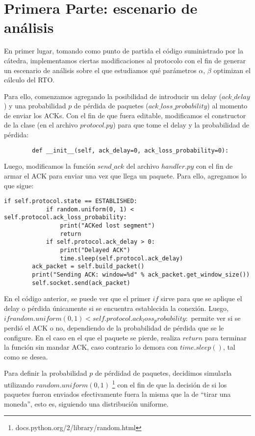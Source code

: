 \documentclass[10pt, a4paper]{article}
\begin{document}
\section{Primera Parte: escenario de análisis}

En primer lugar, tomando como punto de partida el código suministrado por la cátedra, implementamos ciertas modificaciones al protocolo con el fin de generar un escenario de análisis sobre el que estudiamos qué parámetros $\alpha$, $\beta$ optimizan el cálculo del RTO.

Para ello, comenzamos agregando la posibilidad de introducir un delay ($ack\_delay$) y una probabilidad $p$ de pérdida de paquetes ($ack\_loss\_probability$) al momento de enviar los ACKs. Con el fin de que fuera editable, modificamos el constructor de la clase (en el archivo $protocol.py$) para que tome el delay y la probabilidad de pérdida:
\begin{verbatim}
		def __init__(self, ack_delay=0, ack_loss_probability=0):
\end{verbatim}

Luego, modificamos la función $send\_ack$ del archivo $handler.py$ con el fin de armar el ACK para enviar una vez que llega un paquete. Para ello, agregamos lo que sigue:

\begin{verbatim}
if self.protocol.state == ESTABLISHED:
            if random.uniform(0, 1) < self.protocol.ack_loss_probability:
                print("ACKed lost segment")
                return
            if self.protocol.ack_delay > 0:
                print("Delayed ACK")
                time.sleep(self.protocol.ack_delay)
        ack_packet = self.build_packet()
        print("Sending ACK: window=%d" % ack_packet.get_window_size())
        self.socket.send(ack_packet)
\end{verbatim}
        
En el código anterior, se puede ver que el primer $if$ sirve para que se aplique el delay o pérdida únicamente si se encuentra establecida la conexión.
Luego, $if random.uniform(0, 1) < self.protocol.ack_loss_probability:$ permite ver si se perdió el ACK o no, dependiendo de la probabilidad de pérdida que se le configure. En el caso en el que el paquete se pierde, realiza $return$ para terminar la función sin mandar ACK, caso contrario lo demora con $time.sleep()$, tal como se desea.

Para definir la probabilidad $p$ de pérdidad de paquetes, decidimos simularla utilizando $random.uniform(0,1)$ \footnote{docs.python.org/2/library/random.html} con el fin de que la decisión de si los paquetes fueron enviados efectivamente fuera la misma que la de ``tirar una moneda'', esto es, siguiendo una distribución uniforme.
\end{document}
